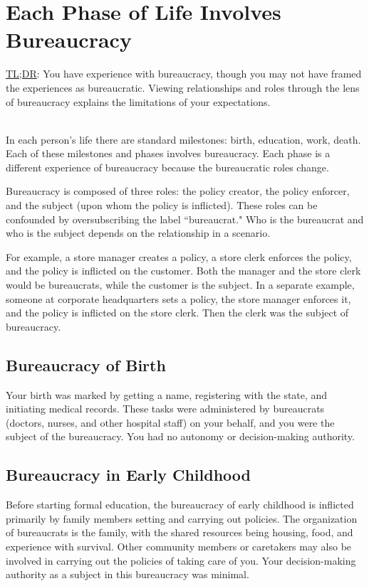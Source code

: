 \section{Each Phase of Life Involves Bureaucracy}

\href{https://en.wikipedia.org/wiki/TL;DR}{TL;DR}: 
You have experience with bureaucracy, though you may not have framed the experiences as bureaucratic. Viewing relationships and roles through the lens of bureaucracy explains the limitations of your expectations.

\ \\

In each person's life there are standard milestones: birth, education, work, death. 
Each of these milestones and phases involves bureaucracy. Each phase is a different experience of bureaucracy because the bureaucratic roles change.

Bureaucracy is composed of three roles: the policy creator, the policy enforcer, and the subject (upon whom the policy is inflicted). 
These roles can be confounded by oversubscribing the label ``bureaucrat." Who is the bureaucrat and who is the subject depends on the relationship in a scenario. 

For example, a store manager creates a policy, a store clerk enforces the policy, 
and the policy is inflicted on the customer. Both the manager and the store clerk would be bureaucrats, while the customer is the subject. In a separate example, someone at corporate headquarters sets a policy, the store manager enforces it, and the policy is inflicted on the store clerk. Then the clerk was the subject of bureaucracy. 


\subsection*{Bureaucracy of Birth\label{sec:bureacracy-of-birth}}
Your birth was marked by getting a name, registering with the state, and initiating medical records. These tasks were administered by bureaucrats (doctors, nurses, and other hospital staff) on your behalf, and you were the subject of the bureaucracy. You had no autonomy or decision-making authority. 

\subsection*{Bureaucracy in Early Childhood\label{sec:bureaucracy-early-childhood}}
Before starting formal education, the bureaucracy of early childhood is inflicted primarily by family members setting and carrying out policies. The organization of bureaucrats is the family, with the shared resources being housing, food, and experience with survival. Other community members or caretakers may also be involved in carrying out the policies of taking care of you. Your decision-making authority as a subject in this bureaucracy was minimal. 

